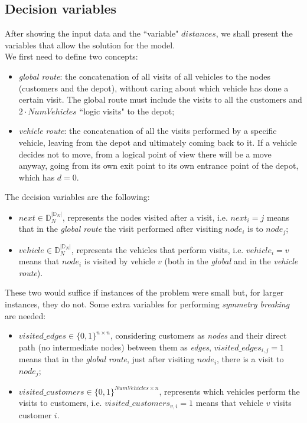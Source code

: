\documentclass[../main.tex]{subfiles}
\begin{document}
\subsection{Decision variables}
After showing the input data and the ``variable" $distances$, we shall present the variables that allow the solution for the model.\\
We first need to define two concepts:
\begin{itemize}
    \item \textit{global route}: the concatenation of all visits of all vehicles to the nodes (customers and the depot), without caring about which vehicle has done a certain visit. The global route must include the visits to all the customers and $2 \cdot NumVehicles$ ``logic visits" to the depot;
    \item \textit{vehicle route}: the concatenation of all the visits performed by a specific vehicle, leaving from the depot and ultimately coming back to it. If a vehicle decides not to move, from a logical point of view there will be a move anyway, going from its own exit point to its own entrance point of the depot, which has $d = 0$.
\end{itemize}
The decision variables are the following:
\begin{itemize}
    \item $next \in \mathbb{D}_N^{|\mathbb{D}_N|}$, represents the nodes visited after a visit, i.e. $next_i = j$ means that in the \textit{global route} the visit performed after visiting $node_i$ is to $node_j$;
    \item $vehicle \in \mathbb{D}_N^{|\mathbb{D}_N|}$, represents the vehicles that perform visits, i.e. $vehicle_i = v$ means that $node_i$ is visited by vehicle $v$ (both in the \textit{global} and in the \textit{vehicle route}).
\end{itemize}
These two would suffice if instances of the problem were small but, for larger instances, they do not. Some extra variables for performing \textit{symmetry breaking} are needed:
\begin{itemize}
    \item $visited\_edges \in \{0,1\}^{n\times{}n}$, considering customers as \textit{nodes} and their direct path (no intermediate nodes) between them as \textit{edges}, $visited\_edges_{i,j} = 1$ means that in the \textit{global route}, just after visiting $node_i$, there is a visit to $node_j$;
    \item $visited\_customers \in \{0,1\}^{NumVehicles\times{}n}$, represents which vehicles perform the visits to customers, i.e. $visited\_customers_{v,i} = 1$ means that vehicle $v$ visits customer $i$.
\end{itemize}
\end{document}
